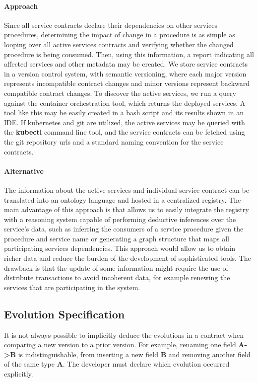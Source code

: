 \paragraph{Approach}
Since all service contracts declare their dependencies on other services procedures, determining the impact of change in a procedure is as simple as
looping over all active services contracts and verifying whether the changed procedure is being consumed.
Then, using this information, a report indicating all affected services and other metadata may be created.
We store service contracts in a version control system, with semantic versioning, where
each major version represents incompatible contract changes and minor versions represent backward compatible contract changes.
To discover the active services, we run a query against the container orchestration tool, which returns the deployed services.
A tool like this may be easily created in a bash script and its results shown in an IDE.
If kubernetes and git are utilized, the active services may be queried with the \textbf{kubectl} command line tool,
and the service contracts can be fetched using the git repository urls and a standard naming convention for the service contracts.

\paragraph{Alternative}
The information about the active services and individual service contract can be translated into an ontology language and hosted in a centralized registry.
The main advantage of this approach is that allows us to easily integrate the registry with a reasoning system capable of performing deductive inferences over the service's data, such as
inferring the consumers of a service procedure given the procedure and service name or generating a graph structure that maps all participating services dependencies.
This approach would allow us to obtain richer data and reduce the burden of the development of sophisticated tools.
The drawback is that the update of some information might require the use of distribute transactions to avoid incoherent data,
for example renewing the services that are participating in the system.

\subsection{Evolution Specification} %
\label{sec:evolution_specification}

It is not always possible to implicitly deduce the evolutions in a contract when comparing a new version to a prior version.
For example, renaming one field \textbf{A->B} is indistinguishable, from inserting a new field \textbf{B} and removing another field of the same type \textbf{A}.
The developer must declare which evolution occurred explicitly.

